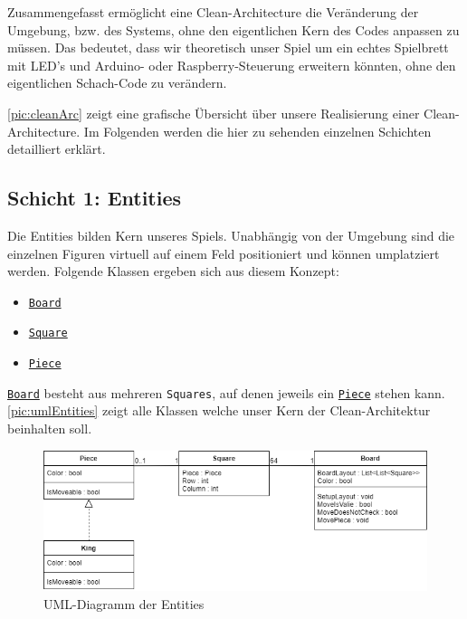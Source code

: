 \documentclass[
10pt, %
a4paper, %
oneside, %
headinclude,footinclude, %
BCOR5mm, %
]{scrartcl}
\begin{document}
\begin{onehalfspace}
Zusammengefasst ermöglicht eine Clean-Architecture die Veränderung der Umgebung, bzw. des Systems, ohne den eigentlichen Kern des Codes anpassen zu müssen.
Das bedeutet, dass wir theoretisch unser Spiel um ein echtes Spielbrett mit LED's und Arduino- oder Raspberry-Steuerung erweitern könnten, ohne den eigentlichen Schach-Code zu verändern.

\autoref{pic:cleanArc} zeigt eine grafische Übersicht über unsere Realisierung einer Clean-Architecture. Im Folgenden werden die hier zu sehenden einzelnen Schichten detailliert erklärt.

\newpage
\subsection{Schicht 1: Entities}
Die Entities bilden Kern unseres Spiels. Unabhängig von der Umgebung sind die einzelnen Figuren virtuell auf einem Feld positioniert und können umplatziert werden.
Folgende Klassen ergeben sich aus diesem Konzept: 

\begin{center}
	\begin{itemize}
		\item \texttt{\href{https://github.com/schmida736/Chess-AdvancedSE/blob/main/Chess-AdvancedSE/Game\%20Elements/Board.cs}{Board}}
		\item \texttt{\href{https://github.com/schmida736/Chess-AdvancedSE/blob/main/Chess-AdvancedSE/Game\%20Elements/Square.cs}{Square}}
		\item \texttt{\href{https://github.com/schmida736/Chess-AdvancedSE/blob/main/Chess-AdvancedSE/Game\%20Elements/Pieces/Piece.cs}{Piece}}
	\end{itemize}
\end{center}

\texttt{\href{https://github.com/schmida736/Chess-AdvancedSE/blob/main/Chess-AdvancedSE/Game\%20Elements/Board.cs}{Board}} besteht aus mehreren \texttt{Squares}, auf denen jeweils ein \texttt{\href{https://github.com/schmida736/Chess-AdvancedSE/blob/main/Chess-AdvancedSE/Game\%20Elements/Pieces/Piece.cs}{Piece}} stehen kann. \autoref{pic:umlEntities} zeigt alle Klassen welche unser Kern der Clean-Architektur beinhalten soll. 
\vspace{0.4cm}
\begin{figure}[h]
	\begin{center}
		\includegraphics[width=13cm]{entities.png}
		\caption{\label{pic:umlEntities} UML-Diagramm der Entities}
	\end{center}
\end{figure}


\end{onehalfspace}
\end{document}
